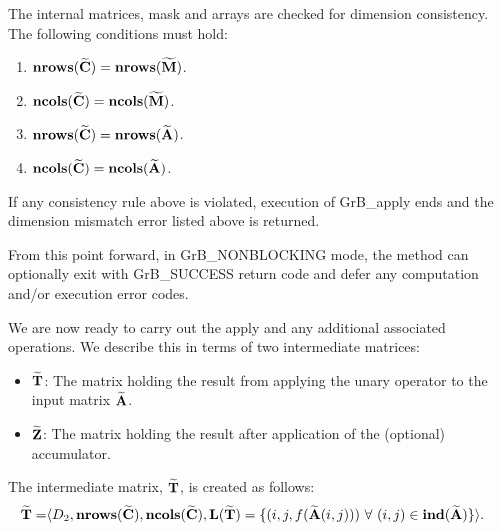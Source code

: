 The internal matrices, mask and arrays are checked for dimension consistency. 
The following conditions must hold:
\begin{enumerate}
	\item $\bold{nrows}({\bf \widetilde{C}}) = \bold{nrows}({\bf \widetilde{M}})$.

	\item $\bold{ncols}({\bf \widetilde{C}}) = \bold{ncols}({\bf \widetilde{M}})$.

	\item $\bold{nrows}({\bf \widetilde{C}}) = \bold{nrows}({\bf \widetilde{A}})$.

	\item $\bold{ncols}({\bf \widetilde{C}}) = \bold{ncols}({\bf \widetilde{A}})$.
\end{enumerate}
If any consistency rule above is violated, execution of {\sf GrB\_apply} ends 
and the dimension mismatch error listed above is returned.

From this point forward, in {\sf GrB\_NONBLOCKING} mode, the method can optionally exit
with {\sf GrB\_SUCCESS} return code and defer any computation and/or execution error codes.

We are now ready to carry out the apply and any additional 
associated operations.  We describe this in terms of two intermediate matrices:
\begin{itemize}
    \item ${\bf \widetilde{T}}$: The matrix holding the result from applying the unary operator to the input matrix
    ${\bf \widetilde{A}}$.
    
    \item ${\bf \widetilde{Z}}$: The matrix holding the result after 
    application of the (optional) accumulator.
\end{itemize}

The intermediate matrix, ${\bf \widetilde{T}}$, is created as follows:
\[
\begin{aligned}
{\bf \widetilde{T}} = & \langle D_2,
                           \bold{nrows}({\bf \widetilde{C}}), 
                           \bold{ncols}({\bf \widetilde{C}}),  \bold{L}({\bf \widetilde{T}}) =
	\{(i,j,f({\bf \widetilde{A}}(i,j))) 
\ \forall \ (i,j) \in 
\bold{ind}({\bf \widetilde{A}}) \} \rangle.
\end{aligned}
\]

